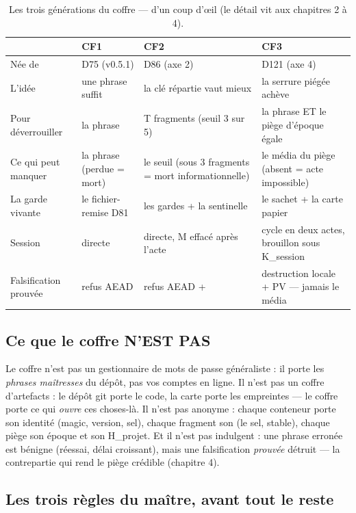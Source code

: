 \begin{table}[htbp]
\centering\small
\caption{Les trois générations du coffre — d'un coup d'œil (le détail vit aux
chapitres 2 à 4).}
\label{tab:generations}
\begin{tabularx}{\textwidth}{@{}l Y Y Y@{}}
\toprule
 & \textbf{CF1} & \textbf{CF2} & \textbf{CF3} \\
\midrule
Née de & D75 (v0.5.1) & D86 (axe 2) & D121 (axe 4) \\
L'idée & une phrase suffit & la clé répartie vaut mieux & la serrure piégée
achève \\
Pour déverrouiller & la phrase & T fragments (seuil 3 sur 5) & la phrase ET le
piège d'époque égale \\
Ce qui peut manquer & la phrase (perdue = mort) & le seuil (sous 3 fragments =
mort informationnelle) & le média du piège (absent = acte impossible) \\
La garde vivante & le fichier-remise D81 & les gardes + la sentinelle & le sachet
+ la carte papier \\
Session & directe & directe, M effacé après l'acte & cycle en deux actes, brouillon
sous K\_session \\
Falsification prouvée & refus AEAD & refus AEAD +  & destruction locale
+ PV — jamais le média \\
\bottomrule
\end{tabularx}
\end{table}

\subsection{Ce que le coffre N'EST PAS}\label{sec:pas}

Le coffre n'est pas un gestionnaire de mots de passe généraliste : il porte les
\emph{phrases maîtresses} du dépôt, pas vos comptes en ligne. Il n'est pas un coffre
d'artefacts : le dépôt git porte le code, la carte porte les empreintes — le coffre
porte ce qui \emph{ouvre} ces choses-là. Il n'est pas anonyme : chaque conteneur porte
son identité (magic, version, sel), chaque fragment son  (le sel, stable),
chaque piège son époque et son H\_projet. Et il n'est pas indulgent : une phrase
erronée est bénigne (réessai, délai croissant), mais une falsification \emph{prouvée}
détruit — la contrepartie qui rend le piège crédible (chapitre 4).

\subsection{Les trois règles du maître, avant tout le reste}\label{sec:troisregles}

